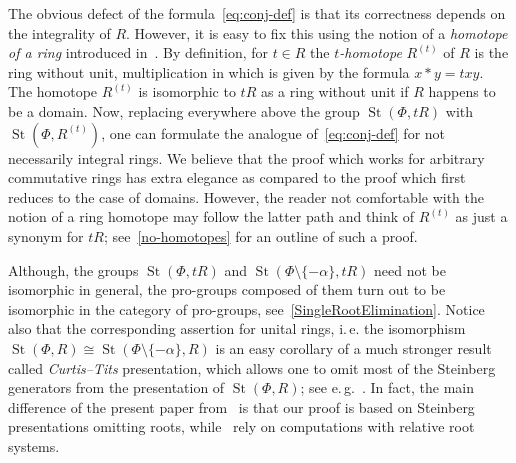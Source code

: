 \documentclass[oneside, 11pt]{amsart}
\numberwithin{equation}{section}
\theoremstyle{definition}
\theoremstyle{remark}
\DeclareMathOperator\St{St}
\begin{document}
The obvious defect of the formula~\eqref{eq:conj-def} is that its correctness depends on the integrality of $R$.
However, it is easy to fix this using the notion of a {\it homotope of a ring} introduced in~\cite{Vor1,Vor2}. By definition, for $t \in R$ the {\it $t$-homotope} $R^{(t)}$ of $R$ is the ring without unit, multiplication in which is given by the formula $x*y=txy$. The homotope $R^{(t)}$ is isomorphic to $tR$ as a ring without unit if $R$ happens to be a domain. 
Now, replacing everywhere above the group $\St(\Phi, tR)$ with $\St(\Phi, R^{(t)})$, one can formulate the analogue of~\eqref{eq:conj-def} for not necessarily integral rings.
We believe that the proof which works for arbitrary commutative rings has extra elegance as compared to the proof which first reduces to the case of domains. However, the reader not comfortable with the notion of a ring homotope may follow the latter path and think of $R^{(t)}$ as just a synonym for $tR$; see~\cref{no-homotopes} for an outline of such a proof.

Although, the groups $\St(\Phi, tR)$ and $\St(\Phi\setminus\{-\alpha\}, tR)$ need not be isomorphic in general, the pro-groups composed of them turn out to be isomorphic in the category of pro-groups, see~\cref{SingleRootElimination}. Notice also that the corresponding assertion for unital rings, i.\,e. the isomorphism $\St(\Phi, R) \cong \St(\Phi\setminus\{-\alpha\}, R)$ is an easy corollary of a much stronger result called {\it Curtis--Tits} presentation, which allows one to omit most of the Steinberg generators from the presentation of $\St(\Phi, R)$; see e.\,g.~\cite[Corollary~1.3]{A13}. In fact, the main difference of the present paper from~\cite{Vor1, Vor2} is that our proof is based on Steinberg presentations omitting roots, while~\cite{Vor1, Vor2} rely on computations with relative root systems. 
\end{document}

